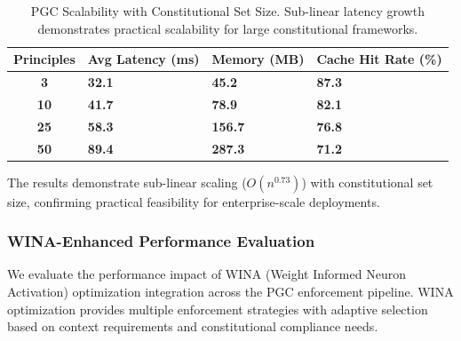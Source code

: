 \documentclass[manuscript,screen,review,anonymous,9pt]{acmart}
\newcommand{\tablesize}{\tiny}
\newcommand{\tablenumfmt}[1]{\textbf{#1}}
\newcommand{\tableheader}[1]{\textbf{#1}}
\begin{document}
\begin{table}[htbp]
	\centering
	\caption{PGC Scalability with Constitutional Set Size. Sub-linear latency growth demonstrates practical scalability for large constitutional frameworks.}
	\label{tab:pgc_scalability}
	\tablesize
	\begin{tabular}{@{}c>{\centering\arraybackslash}p{1.8cm}>{\centering\arraybackslash}p{1.6cm}>{\centering\arraybackslash}p{1.8cm}@{}}
		\toprule
		\tableheader{Principles} & \tableheader{Avg Latency (ms)} & \tableheader{Memory (MB)} & \tableheader{Cache Hit Rate (\%)} \\
		\midrule
		\tablenumfmt{3}          & \tablenumfmt{32.1}             & \tablenumfmt{45.2}        & \tablenumfmt{87.3}                \\
		\tablenumfmt{10}         & \tablenumfmt{41.7}             & \tablenumfmt{78.9}        & \tablenumfmt{82.1}                \\
		\tablenumfmt{25}         & \tablenumfmt{58.3}             & \tablenumfmt{156.7}       & \tablenumfmt{76.8}                \\
		\tablenumfmt{50}         & \tablenumfmt{89.4}             & \tablenumfmt{287.3}       & \tablenumfmt{71.2}                \\
		\bottomrule
	\end{tabular}
\end{table}

The results demonstrate sub-linear scaling ($O(n^{0.73})$) with constitutional set size, confirming practical feasibility for enterprise-scale deployments.

\subsubsection{WINA-Enhanced Performance Evaluation}
\label{subsubsec:wina_performance_evaluation}
We evaluate the performance impact of WINA (Weight Informed Neuron Activation) optimization integration across the PGC enforcement pipeline. WINA optimization provides multiple enforcement strategies with adaptive selection based on context requirements and constitutional compliance needs.
\end{document}
